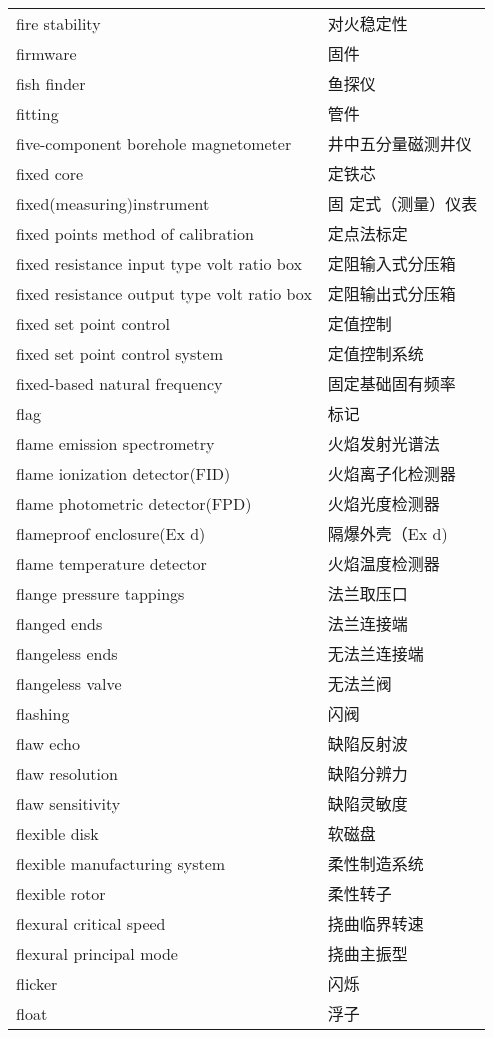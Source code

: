 \documentclass[
]{article}
\begin{document}
\begin{longtable}[]{@{}ll@{}}
fire stability & 对火稳定性 \\
firmware & 固件 \\
fish finder & 鱼探仪 \\
fitting & 管件 \\
five-component borehole magnetometer & 井中五分量磁测井仪 \\
fixed core & 定铁芯 \\
fixed(measuring)instrument & 固 定式（测量）仪表 \\
fixed points method of calibration & 定点法标定 \\
fixed resistance input type volt ratio box & 定阻输入式分压箱 \\
fixed resistance output type volt ratio box & 定阻输出式分压箱 \\
fixed set point control & 定值控制 \\
fixed set point control system & 定值控制系统 \\
fixed-based natural frequency & 固定基础固有频率 \\
flag & 标记 \\
flame emission spectrometry & 火焰发射光谱法 \\
flame ionization detector(FID) & 火焰离子化检测器 \\
flame photometric detector(FPD) & 火焰光度检测器 \\
flameproof enclosure(Ex d) & 隔爆外壳（Ex d) \\
flame temperature detector & 火焰温度检测器 \\
flange pressure tappings & 法兰取压口 \\
flanged ends & 法兰连接端 \\
flangeless ends & 无法兰连接端 \\
flangeless valve & 无法兰阀 \\
flashing & 闪阀 \\
flaw echo & 缺陷反射波 \\
flaw resolution & 缺陷分辨力 \\
flaw sensitivity & 缺陷灵敏度 \\
flexible disk & 软磁盘 \\
flexible manufacturing system & 柔性制造系统 \\
flexible rotor & 柔性转子 \\
flexural critical speed & 挠曲临界转速 \\
flexural principal mode & 挠曲主振型 \\
flicker & 闪烁 \\
float & 浮子 \\

\end{longtable}
\end{document}
